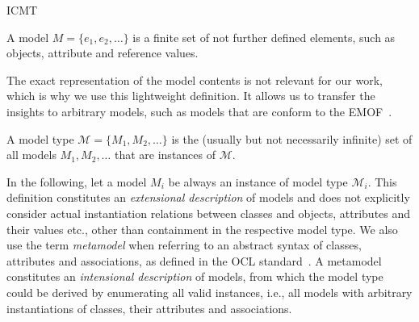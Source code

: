 \begin{copiedFrom}{ICMT}
\begin{definition}[Model]
A model $M = \{e_1, e_2, \ldots\}$ is a finite set of not further defined elements, such as objects, attribute and reference values.
\end{definition}

The exact representation of the model contents is not relevant for our work, which is why we use this lightweight definition. 
It allows us to transfer the insights to arbitrary models, such as models that are conform to the \ac{EMOF}~\cite{mof}.

\begin{definition}
A model type $\mathcal{M} = \{M_1, M_2, \dots\}$ is the (usually but not necessarily infinite) set of all models $M_1, M_2, \dots$ that are instances of $\mathcal{M}$.
\end{definition}

In the following, let a model $M_i$ be always an instance of model type $\mathcal{M}_i$.
This definition constitutes an \emph{extensional description} of models and does not explicitly consider actual instantiation relations between classes and objects, attributes and their values etc., other than containment in the respective model type. 
We also use the term \emph{metamodel} when referring to an abstract syntax of classes, attributes and associations, as defined in the OCL standard~\cite[A.1]{ocl}. 
A metamodel constitutes an \emph{intensional description} of models, from which the model type could be derived by enumerating all valid instances, i.e., all models with arbitrary instantiations of classes, their attributes and associations.




\end{copiedFrom}
